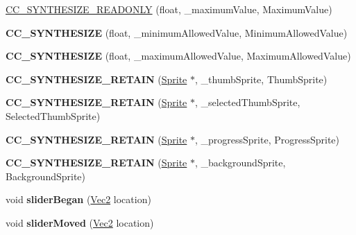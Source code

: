 \begin{DoxyCompactItemize}
\hyperlink{classControlSlider_ac2c89169b57eaecd0f9b5a8d592d269b}{C\+C\+\_\+\+S\+Y\+N\+T\+H\+E\+S\+I\+Z\+E\+\_\+\+R\+E\+A\+D\+O\+N\+LY} (float, \+\_\+maximum\+Value, Maximum\+Value)
\item 
\mbox{\label{classControlSlider_a8f2bb847dc92e5d8609de9ba9f4af4c3}} 
{\bfseries C\+C\+\_\+\+S\+Y\+N\+T\+H\+E\+S\+I\+ZE} (float, \+\_\+minimum\+Allowed\+Value, Minimum\+Allowed\+Value)
\item 
\mbox{\label{classControlSlider_ad7b7f384fd2531e888f79335da9dfa7e}} 
{\bfseries C\+C\+\_\+\+S\+Y\+N\+T\+H\+E\+S\+I\+ZE} (float, \+\_\+maximum\+Allowed\+Value, Maximum\+Allowed\+Value)
\item 
\mbox{\label{classControlSlider_aeeebe247ae2d140934a907906a3495ac}} 
{\bfseries C\+C\+\_\+\+S\+Y\+N\+T\+H\+E\+S\+I\+Z\+E\+\_\+\+R\+E\+T\+A\+IN} (\hyperlink{classSprite}{Sprite} $\ast$, \+\_\+thumb\+Sprite, Thumb\+Sprite)
\item 
\mbox{\label{classControlSlider_a53bfb4f761cc224291817e7ed61147f7}} 
{\bfseries C\+C\+\_\+\+S\+Y\+N\+T\+H\+E\+S\+I\+Z\+E\+\_\+\+R\+E\+T\+A\+IN} (\hyperlink{classSprite}{Sprite} $\ast$, \+\_\+selected\+Thumb\+Sprite, Selected\+Thumb\+Sprite)
\item 
\mbox{\label{classControlSlider_accf2eeb33224f6140f4f4a2a5d162679}} 
{\bfseries C\+C\+\_\+\+S\+Y\+N\+T\+H\+E\+S\+I\+Z\+E\+\_\+\+R\+E\+T\+A\+IN} (\hyperlink{classSprite}{Sprite} $\ast$, \+\_\+progress\+Sprite, Progress\+Sprite)
\item 
\mbox{\label{classControlSlider_a45029597a1158a383ad7c495ea1af7ae}} 
{\bfseries C\+C\+\_\+\+S\+Y\+N\+T\+H\+E\+S\+I\+Z\+E\+\_\+\+R\+E\+T\+A\+IN} (\hyperlink{classSprite}{Sprite} $\ast$, \+\_\+background\+Sprite, Background\+Sprite)
\item 
\mbox{\label{classControlSlider_ab7ced3d412aaea1f04c1a8e764e94f37}} 
void {\bfseries slider\+Began} (\hyperlink{classVec2}{Vec2} location)
\item 
\mbox{\label{classControlSlider_a97b7201da57617902fc4202426b19958}} 
void {\bfseries slider\+Moved} (\hyperlink{classVec2}{Vec2} location)

\end{DoxyCompactItemize}
